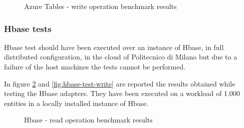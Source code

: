\begin{figure}[tbh]
  \centering
  \caption{Azure Tables - write operation benchmark results}
  \label{fig:azure-test-write}
\end{figure} 

\subsubsection{Hbase tests}
Hbase test should have been executed over an instance of Hbase, in full distributed configuration, in the cloud of Politecnico di Milano but due to a failure of the host machines the tests cannot be performed.

\noindent In figure \ref{fig:hbase-test-read} and \ref{fig:hbase-test-write} are reported the results obtained while testing the Hbase adapters. They have been executed on a workload of 1.000 entities in a locally installed instance of Hbase.

\begin{figure}[tbh]
  \centering
  \caption{Hbase - read operation benchmark results}
  \label{fig:hbase-test-read}
\end{figure} 

